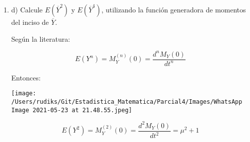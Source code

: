 \begin{enumerate}
\begin{solution}
	La demostración del caso general es la siguiente: 
	\begin{align*}
		m_U(t) &= E(\exp(tU))\\
					   &= \int_{-\infty}^{\infty} \exp(tU)\cdot f(U)dU\\
		      		   &=\frac{1}{\sigma \sqrt{2 \pi}} \int_{-\infty}^{\infty} \exp \left(t U-\frac{(U-\mu)^{2}}{2 \sigma^{2}}\right) \mathrm{d} U \\
						&=\frac{\sqrt{2} \sigma}{\sigma \sqrt{2 \pi}} \int_{-\infty}^{\infty} \exp \left((\sqrt{2} \sigma z+\mu) t-z^{2}\right) \mathrm{d} z \quad \text { sustituyendo } z=\frac{U-\mu}{\sqrt{2} \sigma} \\
				   		&=\frac{\exp\{\mu t\}}{\sqrt{\pi}} \int_{-\infty}^{\infty} \exp \left(-\left(z^{2}-\sqrt{2} \sigma z t\right)\right) \mathrm{d} z \\
				   		&=\frac{\exp\{\mu t\}}{\sqrt{\pi}} \int_{-\infty}^{\infty} \exp \left(-\left(z-\frac{\sqrt{2}}{2} \sigma t\right)^{2}+\frac{1}{2} \sigma^{2} t^{2}\right) \mathrm{d} z \\
				   		&=\frac{\exp \left(\mu t+\frac{1}{2} \sigma^{2} t^{2}\right)}{\sqrt{\pi}} \int_{-\infty}^{\infty} \exp \left(-v^{2}\right) \mathrm{d} v \quad \text { sustituyendo } v=z-\frac{\sqrt{2}}{2} \sigma t \\
				   		&=\frac{\sqrt{\pi} \exp \left(\mu t+\frac{1}{2} \sigma^{2} t^{2}\right)}{\sqrt{\pi}} \quad \\
				       &=\exp \left(\mu t+\frac{1}{2} \sigma^{2} t^{2}\right)
				       \intertext{Para el caso en donde $\sigma^2=1$}
				       &=\exp \left(\mu t+\frac{1}{2}  t^{2}\right)
	\end{align*}
	\end{solution}
	\item d) Calcule $E\left(\overline{Y}^{2}\right)$ y $E\left(\overline{Y}^{4}\right)$, utilizando la función generadora de momentos del inciso de
	$\overline{Y}$.
	\begin{solution}
		Según la literatura:
		\begin{tcolorbox}[colback=gray!15,colframe=black!1!black,title=Valor esperado]
			$$E(Y^n)=M^{(n)}_Y(0)=\frac{d^nM_Y(0)}{dt^n}$$
			\end{tcolorbox}
		Entonces: 
		\begin{center}
			\texttt{[image: /Users/rudiks/Git/Estadistica\_Matematica/Parcial4/Images/WhatsApp Image 2021-05-23 at 21.48.55.jpeg]}
		\end{center}
		$$E(Y^2)=M^{(2)}_Y(0)=\frac{d^2M_Y(0)}{dt^2}=\mu^2+1$$

\end{solution}
\end{enumerate}
